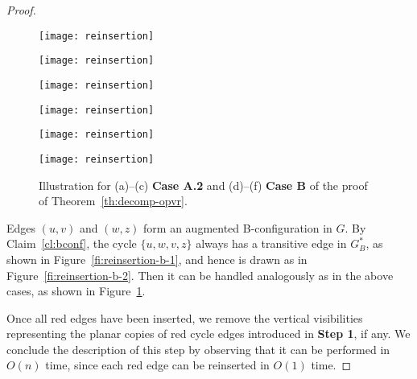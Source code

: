 \documentclass{article}
\begin{document}
\begin{proof}
\begin{figure}[t]
    \centering  
    \begin{minipage}[b]{.31\textwidth}
    	\centering
    	\texttt{[image: reinsertion]}
    	\subcaption{}\label{fi:reinsertion-a2-1}
    \end{minipage}
    \begin{minipage}[b]{.31\textwidth}
    	\centering
    	\texttt{[image: reinsertion]}
    	\subcaption{}\label{fi:reinsertion-a2-2}
    \end{minipage}
    \begin{minipage}[b]{.31\textwidth}
    	\centering
    	\texttt{[image: reinsertion]}
    	\subcaption{}\label{fi:reinsertion-a2-3}
    \end{minipage}
    \begin{minipage}[b]{.31\textwidth}
    	\centering
    	\texttt{[image: reinsertion]}
    	\subcaption{}\label{fi:reinsertion-b-1}
    \end{minipage}
    \begin{minipage}[b]{.31\textwidth}
    	\centering
    	\texttt{[image: reinsertion]}
    	\subcaption{}\label{fi:reinsertion-b-2}
    \end{minipage}
    \begin{minipage}[b]{.31\textwidth}
    	\centering
    	\texttt{[image: reinsertion]}
    	\subcaption{}\label{fi:reinsertion-b-3}
    \end{minipage}
    \caption{Illustration for (a)--(c) {\bf Case A.2} and (d)--(f) {\bf Case B} of the proof of Theorem~\ref{th:decomp-opvr}.}
\end{figure}


\smallskip{}  Edges $(u,v)$ and $(w,z)$ form an augmented B-configuration in $G$. By Claim~\ref{cl:bconf}, the cycle $\{u,w,v,z\}$ always has a transitive edge in $G^*_B$, as shown in Figure~\ref{fi:reinsertion-b-1}, and hence is drawn as in Figure~\ref{fi:reinsertion-b-2}. Then it can be handled analogously as in the above cases, as shown in Figure~\ref{fi:reinsertion-b-3}.

Once all red edges have been inserted, we remove the vertical visibilities representing the planar copies of red cycle edges introduced in \textbf{Step 1}, if any. We conclude the description of this step by observing that it can be performed in $O(n)$ time, since each red edge can be reinserted in $O(1)$ time. 


\end{proof}
\end{document}
